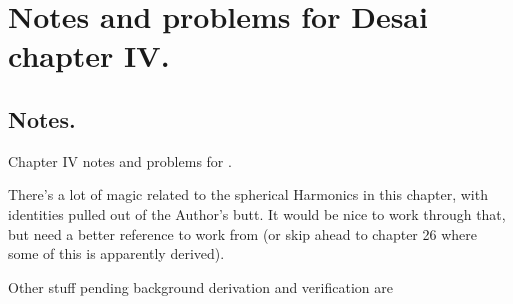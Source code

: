 
%

\chapter{Notes and problems for Desai chapter IV.}
\label{chap:desaiCh4}
{}
\date{Oct 10, 2010}

\beginArtWithToc

\section{Notes.}

Chapter IV notes and problems for \cite{desai2009quantum}.

There's a lot of magic related to the spherical Harmonics in this chapter, with identities pulled out of the Author's butt.  It would be nice to work through that, but need a better reference to work from (or skip ahead to chapter 26 where some of this is apparently derived).

Other stuff pending background derivation and verification are

